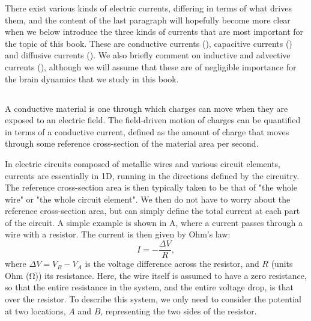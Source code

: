There exist various kinds of electric currents, differing in terms of what drives them, and the content of the last paragraph will hopefully become more clear when we below introduce the three kinds of currents that are most important for the topic of this book. These are conductive currents (), capacitive currents () and diffusive currents (). We also briefly comment on inductive and advective currents (), although we will assume that these are of negligible importance for the brain dynamics that we study in this book. 


\subsection{}
\label{sec:Basics:ConductiveCurrent}
A conductive material  is one through which charges can move 
  
when they are exposed to an electric field. The field-driven motion of charges can be quantified in terms of a conductive current, defined as the amount of charge that moves through some reference cross-section of the material area per second.

In electric circuits composed of metallic wires and various circuit elements, currents are essentially in 1D, running in the directions defined by the circuitry. The reference cross-section area is then typically taken to be that of "the whole wire" or "the whole circuit element". We then do not have to worry about the reference cross-section area, but can simply define the total current at each part of the circuit. 
A simple example is shown in A, where a current passes through a wire with a resistor. The current is then given by Ohm's law:
\begin{equation}
I = - \frac{\Delta V}{R},
\label{eq:Basics:Ohm_R}
\end{equation}
where $\Delta V = V_B-V_A$ is the voltage difference across the resistor, and $R$ (units Ohm (\si{\ohm})) its resistance. Here, the wire itself is assumed to have a zero resistance, so that the entire resistance in the system, and the entire voltage drop, is that over the resistor. To describe this system, we only need to consider the potential at two locations, $A$ and $B$, representing the two sides of the resistor.

